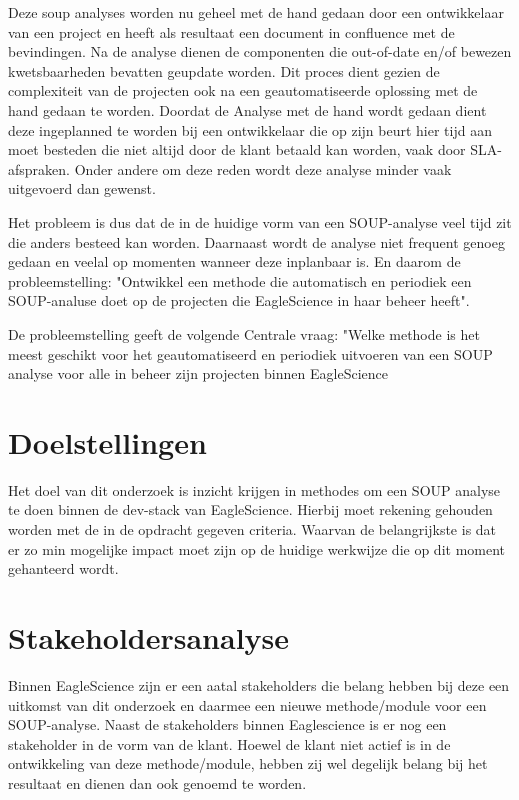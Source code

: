 Deze soup analyses worden nu geheel met de hand gedaan door een ontwikkelaar van een project en heeft als resultaat een document in confluence met de bevindingen. Na de analyse dienen de componenten die out-of-date en/of bewezen kwetsbaarheden bevatten geupdate worden. Dit proces dient gezien de complexiteit van de projecten ook na een geautomatiseerde oplossing met de hand gedaan te worden. Doordat de Analyse met de hand wordt gedaan dient deze ingeplanned te worden bij een ontwikkelaar die op zijn beurt hier tijd aan moet besteden die niet altijd door de klant betaald kan worden, vaak door SLA-afspraken. Onder andere om deze reden wordt deze analyse minder vaak uitgevoerd dan gewenst.

Het probleem is dus dat de in de huidige vorm van een SOUP-analyse veel tijd zit die anders besteed kan worden. Daarnaast wordt de analyse niet frequent genoeg gedaan en veelal op momenten wanneer deze inplanbaar is. En daarom de probleemstelling: "Ontwikkel een methode die automatisch en periodiek een SOUP-analuse doet op de projecten die EagleScience in haar beheer heeft".

De probleemstelling geeft de volgende Centrale vraag: "Welke methode is het meest geschikt voor het geautomatiseerd en periodiek uitvoeren van een SOUP analyse voor alle in beheer zijn projecten binnen EagleScience


\section{Doelstellingen}\label{sec:doelstellingen}
Het doel van dit onderzoek is inzicht krijgen in methodes om een SOUP analyse te doen binnen de dev-stack van EagleScience. Hierbij moet rekening gehouden worden met de in de opdracht gegeven criteria. Waarvan de belangrijkste is dat er zo min mogelijke impact moet zijn op de huidige werkwijze die op dit moment gehanteerd wordt.




\section{Stakeholdersanalyse}\label{sec:stakeholdersanalyse}
Binnen EagleScience zijn er een aatal stakeholders die belang hebben bij deze een uitkomst van dit onderzoek en daarmee een nieuwe methode/module voor een SOUP-analyse. Naast de stakeholders binnen Eaglescience is er nog een stakeholder in de vorm van de klant. Hoewel de klant niet actief is in de ontwikkeling van deze methode/module, hebben zij wel degelijk belang bij het resultaat en dienen dan ook genoemd te worden.

